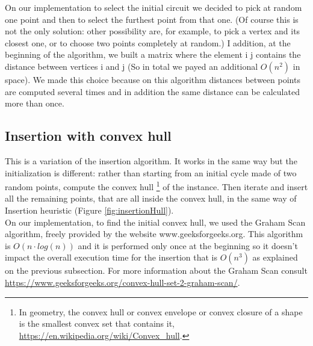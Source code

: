\noindent On our implementation to select the initial circuit we decided to pick at random one point and then to select the furthest point from that one. (Of course this is not the only solution: other possibility are, for example, to pick a vertex and its closest one, or to choose two points completely at random.) I addition, at the beginning of the algorithm, we built a matrix where the element i j contains the distance between vertices i and j (So in total we payed an additional $O(n^2)$ in space). We made this choice because on this algorithm distances between points are computed several times and in addition the same distance can be calculated more than once.\\


\subsection{Insertion with convex hull}
This is a variation of the insertion algorithm. It works in the same way but the initialization is different: rather than starting from an initial cycle made of two random points, compute the convex hull \footnote{In geometry, the convex hull or convex envelope or convex closure of a shape is the smallest convex set that contains it, \url{https://en.wikipedia.org/wiki/Convex_hull}.
} of the instance. Then iterate and insert all the remaining points, that are all inside the convex hull, in the same way of Insertion heuristic (Figure \ref{fig:insertionHull}).\\
On our implementation, to find the initial convex hull, we used the Graham Scan algorithm, freely provided by the website www.geeksforgeeks.org. This algorithm is $O(n \cdot log(n))$ and it is performed only once at the beginning so it doesn't impact the overall execution time for the insertion that is $O(n^3)$ as explained on the previous subsection. For more information about the Graham Scan consult \url{https://www.geeksforgeeks.org/convex-hull-set-2-graham-scan/}.

